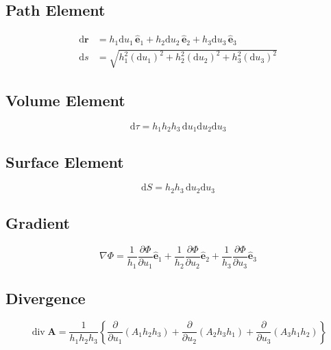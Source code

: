 \documentclass{article}
\theoremstyle{definition}
\theoremstyle{definition}
\theoremstyle{remark}
\newcommand{\vecr}{\mathbf{r}}
\newcommand{\vecA}{\mathbf{A}}
\newcommand{\bhat}[1]{\mathbf{\hat{#1}}}
\DeclareMathOperator{\vdiv}{div}
\begin{document}
\subsection{Path Element}

\begin{align*}
    \mathrm{d}\vecr &= h_1 \mathrm{d}u_1 \,\bhat{e}_1 + h_2 \mathrm{d}u_2 \,\bhat{e}_2 + h_3 \mathrm{d}u_3 \,\bhat{e}_3 \\
    \mathrm{d}s &= \sqrt{h_1^2 (\mathrm{d}u_1)^2 + h_2^2 (\mathrm{d}u_2)^2 + h_3^2 (\mathrm{d}u_3)^2}
\end{align*}

\subsection{Volume Element}

\begin{equation*}
    \mathrm{d}\tau = h_1 h_2 h_3 \,\mathrm{d}u_1 \mathrm{d}u_2 \mathrm{d}u_3
\end{equation*}

\subsection{Surface Element}

\begin{equation*}
    \mathrm{d}S = h_2 h_3 \,\mathrm{d}u_2 \mathrm{d}u_3
\end{equation*}

\subsection{Gradient}

\begin{equation*}
    \nabla \Phi = \frac{1}{h_1} \frac{\partial \Phi}{\partial u_1} \bhat{e}_1 + \frac{1}{h_2} \frac{\partial \Phi}{\partial u_2} \bhat{e}_2 + \frac{1}{h_3} \frac{\partial \Phi}{\partial u_3} \bhat{e}_3
\end{equation*}

\subsection{Divergence}

\begin{equation*}
    \vdiv \vecA
    = \frac{1}{h_1 h_2 h_3} \left\{
    \frac{\partial}{\partial u_1} (A_1 h_2 h_3)
    + \frac{\partial}{\partial u_2} (A_2 h_3 h_1)
    + \frac{\partial}{\partial u_3} (A_3 h_1 h_2)
    \right\}
\end{equation*}
\end{document}
